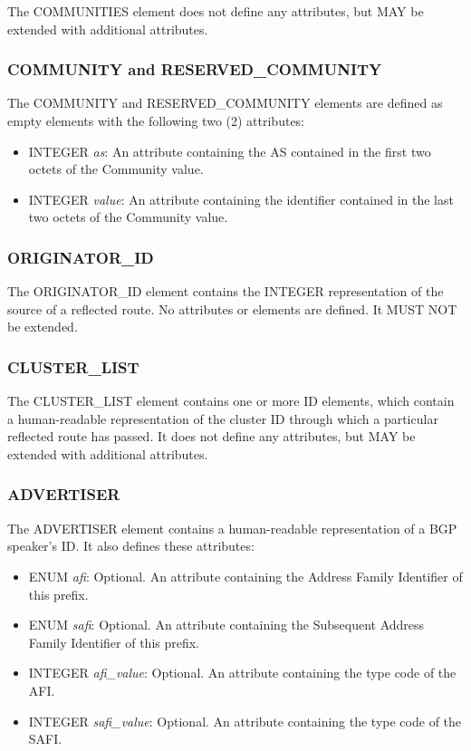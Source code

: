 \documentclass{article}
\begin{document}
The COMMUNITIES element does not define any attributes, but MAY be extended with additional attributes.

\subsubsection{COMMUNITY and RESERVED_COMMUNITY}
The COMMUNITY and RESERVED_COMMUNITY elements are defined as empty elements with the following two (2) attributes:

\begin{itemize}
\item{INTEGER \emph{as}: An attribute containing the AS contained in the first two octets of the Community value.}
\item{INTEGER \emph{value}: An attribute containing the identifier contained in the last two octets of the Community value.}
\end{itemize}

\subsubsection{ORIGINATOR_ID}
The ORIGINATOR_ID element contains the INTEGER representation of the source of a reflected route.  No attributes or elements are defined.  It MUST NOT be extended.

\subsubsection{CLUSTER_LIST}
The CLUSTER_LIST element contains one or more ID elements, which contain a human-readable representation of the cluster ID through which a particular reflected route has passed.  It does not define any attributes, but MAY be extended with additional attributes.

\subsubsection{ADVERTISER}
The ADVERTISER element contains a human-readable representation of a BGP speaker's ID.  It also defines these attributes:

\begin{itemize}
\item{ENUM \emph{afi}: Optional. An attribute containing the Address Family Identifier of this prefix.}
\item{ENUM \emph{safi}: Optional. An attribute containing the Subsequent Address Family Identifier of this prefix.}
\item{INTEGER \emph{afi_value}: Optional. An attribute containing the type code of the AFI.}
\item{INTEGER \emph{safi_value}: Optional. An attribute containing the type code of the SAFI.}
\end{itemize}
\end{document}
